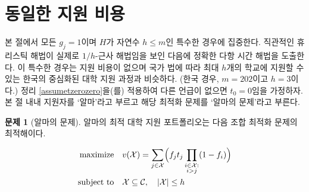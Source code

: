\documentclass[11pt]{article} %
\newif\ifen
\theoremstyle{definition}
\newtheorem{problem}{Problem}
\theoremstyle{definition}
\newtheorem{problem}{문제}
\begin{document}



\ifen \section{Homogeneous application costs}  \else \section{동일한 지원 비용} \fi \label{homogappcosts}
\ifen In this section, we focus on the special case in which each $g_j = 1$ and $H$ is a natural number $h \leq m$.   We show that an intuitive heuristic is in fact a $1/h$-approximation algorithm, then derive an exact polynomial-time solution algorithm.
This case is similar to the centralized college admissions process in Korea, where there is no application fee, but by law, students are allowed to apply to no more than $h$ schools. (In the Korean case, $m=202$ and $h=3$.) Applying Theorem \ref{assumetzerozero}, we assume that $t_0 = 0$ unless otherwise noted. Throughout this section, we will call the applicant Alma, and refer to the corresponding optimization problem as Alma's problem. 
\else
본 절에서 모든 $g_j = 1$이며 $H$가 자연수 $h \leq m$인 특수한 경우에 집중한다. 직관적인 휴리스틱 해법이 실제로 $1/h$-근사 해법임을 보인 다음에 정확한 다항 시간 해법을 도출한다. 이 특수한 경우는 지원 비용이 없으며 국가 법에 따라 최대 $h$개의 학교에 지원할 수 있는 한국의 중심화된 대학 지원 과정과 비슷하다. (한국 경우,  $m=202$이고 $h=3$이다.) 정리 \ref{assumetzerozero}을(를) 적용하여 다른 언급이 없으면 $t_0 = 0$임을 가정하자. 본 절 내내 지원자를 `알마'라고 부르고 해당 최적화 문제를 `알마의 문제'라고 부른다.
\fi

\begin{problem}[\ifen Alma’s problem\else 알마의 문제\fi]
\ifen Alma's optimal college application portfolio is given by the solution to the following combinatorial optimization problem:
\else
알마의 최적 대학 지원 포트폴리오는 다음 조합 최적화 문제의 최적해이다.
\fi
\begin{align}
\begin{split}
\text{maximize}\quad &  v(\mathcal{X}) = \sum_{j\in
\mathcal{X}} \Bigl( f_j t_j \prod_{\substack{i \in \mathcal{X}: \\ i > j}} (1 - f_{i}) \Bigr)\\
\text{subject to}\quad & \mathcal{X}\subseteq\mathcal{C}, \quad|\mathcal{X}| \leq h 
\end{split}
\end{align}
\end{problem}
\end{document}
